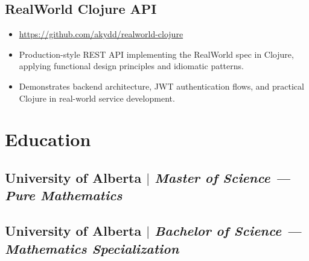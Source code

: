 \documentclass[10pt]{article}
\begin{document}
\subsection{RealWorld Clojure API}

\begin{itemize}
  \item \url{https://github.com/akydd/realworld-clojure}
  \item Production-style REST API implementing the RealWorld spec in Clojure, applying functional design principles and idiomatic patterns.
  \item Demonstrates backend architecture, JWT authentication flows, and practical Clojure in real-world service development.
\end{itemize}

\section{Education}

\subsection{University of Alberta $|$ \normalfont\textit{Master of Science --- Pure Mathematics}}
\subsection{University of Alberta $|$ \normalfont\textit{Bachelor of Science --- Mathematics Specialization}}
\end{document}
